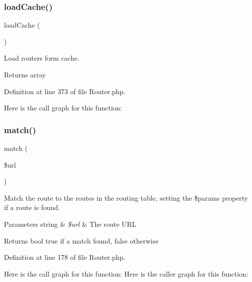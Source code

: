 \subsubsection{\texorpdfstring{load\+Cache()}{loadCache()}}
{\footnotesize\ttfamily load\+Cache (\begin{DoxyParamCaption}{ }\end{DoxyParamCaption})}

Load routers form cache.

\begin{DoxyReturn}{Returns}
array 
\end{DoxyReturn}


Definition at line 373 of file Router.\+php.

Here is the call graph for this function\+:
\mbox{\label{class_zest_1_1_router_1_1_router_abd724f6a6c6ad25275026dede10a1495}} 
\subsubsection{\texorpdfstring{match()}{match()}}
{\footnotesize\ttfamily match (\begin{DoxyParamCaption}\item[{}]{\$url }\end{DoxyParamCaption})}

Match the route to the routes in the routing table, setting the \$params property if a route is found.


\begin{DoxyParams}[1]{Parameters}
string & {\em \$url} & The route U\+RL\\
\hline
\end{DoxyParams}
\begin{DoxyReturn}{Returns}
bool true if a match found, false otherwise 
\end{DoxyReturn}


Definition at line 178 of file Router.\+php.

Here is the call graph for this function\+:
Here is the caller graph for this function\+:
\mbox{\label{class_zest_1_1_router_1_1_router_a732fd0dc552efc395b1ed94302359743}} 
